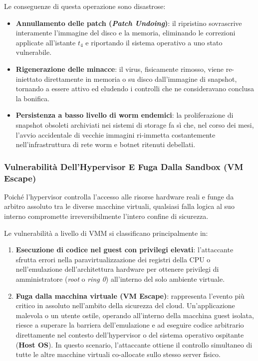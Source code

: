 \documentclass[11pt, a4paper]{article}
\begin{document}
Le conseguenze di questa operazione sono disastrose:
\begin{itemize}
    \item \textbf{Annullamento delle patch (\emph{Patch Undoing})}: il ripristino sovrascrive interamente l'immagine del disco e la memoria, eliminando le correzioni applicate all'istante $t_4$ e riportando il sistema operativo a uno stato vulnerabile.
    \item \textbf{Rigenerazione delle minacce}: il virus, fisicamente rimosso, viene re-iniettato direttamente in memoria o su disco dall'immagine di snapshot, tornando a essere attivo ed eludendo i controlli che ne consideravano conclusa la bonifica.
    \item \textbf{Persistenza a basso livello di worm endemici}: la proliferazione di snapshot obsoleti archiviati nei sistemi di storage fa sì che, nel corso dei mesi, l'avvio accidentale di vecchie immagini ri-immetta costantemente nell'infrastruttura di rete worm e botnet ritenuti debellati.
\end{itemize}

\subsubsection{Vulnerabilità Dell'Hypervisor E Fuga Dalla Sandbox (VM Escape)}
Poiché l'hypervisor controlla l'accesso alle risorse hardware reali e funge da arbitro assoluto tra le diverse macchine virtuali, qualsiasi falla logica al suo interno compromette irreversibilmente l'intero confine di sicurezza.

Le vulnerabilità a livello di VMM si classificano principalmente in:
\begin{enumerate}
    \item \textbf{Esecuzione di codice nel guest con privilegi elevati}: l'attaccante sfrutta errori nella paravirtualizzazione dei registri della CPU o nell'emulazione dell'architettura hardware per ottenere privilegi di amministratore (\emph{root} o \emph{ring 0}) all'interno del solo ambiente virtuale.
    \item \textbf{Fuga dalla macchina virtuale (\textbf{VM Escape})}: rappresenta l'evento più critico in assoluto nell'ambito della sicurezza del cloud. Un'applicazione malevola o un utente ostile, operando all'interno della macchina guest isolata, riesce a superare la barriera dell'emulazione e ad eseguire codice arbitrario direttamente nel contesto dell'hypervisor o del sistema operativo ospitante (\textbf{Host OS}). In questo scenario, l'attaccante ottiene il controllo simultaneo di tutte le altre macchine virtuali co-allocate sullo stesso server fisico.
\end{enumerate}
\end{document}
